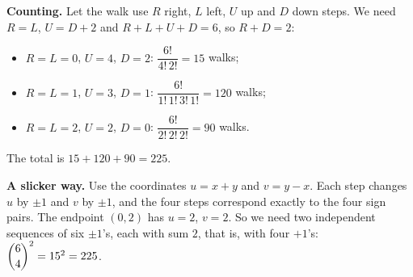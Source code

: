 \textbf{Counting.} Let the walk use $R$ right, $L$ left, $U$ up and $D$ down steps. We need $R=L$, $U=D+2$ and $R+L+U+D=6$, so $R+D=2$:
\begin{itemize}
\item $R=L=0$, $U=4$, $D=2$: $\dfrac{6!}{4!\,2!}=15$ walks;
\item $R=L=1$, $U=3$, $D=1$: $\dfrac{6!}{1!\,1!\,3!\,1!}=120$ walks;
\item $R=L=2$, $U=2$, $D=0$: $\dfrac{6!}{2!\,2!\,2!}=90$ walks.
\end{itemize}
The total is $15+120+90=\boxed{225}$.

\textbf{A slicker way.} Use the coordinates $u=x+y$ and $v=y-x$. Each step changes $u$ by $\pm1$ and $v$ by $\pm1$, and the four steps correspond exactly to the four sign pairs. The endpoint $(0,2)$ has $u=2$, $v=2$. So we need two independent sequences of six $\pm1$'s, each with sum $2$, that is, with four $+1$'s: $\dbinom64^2=15^2=225$.
